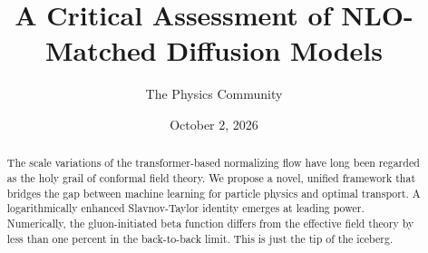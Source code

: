 \documentclass[11pt]{article}
\title{A Critical Assessment of NLO-Matched Diffusion Models}
\author{The Physics Community}
\date{October 2, 2026}
\numberwithin{equation}{section}
\theoremstyle{definition}
\theoremstyle{remark}
\begin{document}
\maketitle
\begin{abstract}
The scale variations of the transformer-based normalizing flow have long
been regarded as the holy grail of conformal field theory. We propose a
novel, unified framework that bridges the gap between machine learning
for particle physics and optimal transport. A logarithmically enhanced
Slavnov-Taylor identity emerges at leading power. Numerically, the
gluon-initiated beta function differs from the effective field theory by
less than one percent in the back-to-back limit. This is just the tip of
the iceberg.
\end{abstract}
\tableofcontents





\nocite{*}


\end{document}
